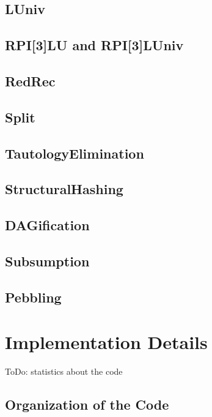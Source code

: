 \documentclass{llncs}
\begin{document}
\subsection{LUniv}

\subsection{RPI[3]LU and RPI[3]LUniv}

\subsection{RedRec}

\subsection{Split}

\subsection{TautologyElimination}

\subsection{StructuralHashing}

\subsection{DAGification}

\subsection{Subsumption}

\subsection{Pebbling}





\section{Implementation Details}

ToDo: statistics about the code

\subsection{Organization of the Code}
\end{document}
